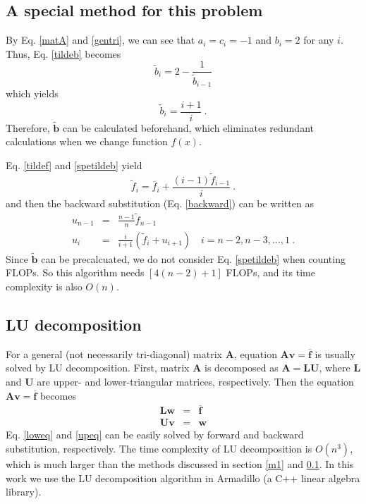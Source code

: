 \documentclass{article}
\begin{document}
	\subsection{A special method for this problem}\label{m2}
	By Eq. \ref{matA} and \ref{gentri}, we can see that $a_i=c_i=-1$ and $b_i=2$ for any $i$.  
	Thus, Eq. \ref{tildeb} becomes 
	\begin{equation}
	\tilde{b}_i=2-\frac{1}{\tilde{b}_{i-1}}
	\end{equation}
	which yields  
	\begin{equation}\label{spetildeb}
	\tilde{b}_i=\frac{i+1}{i}\ . 
	\end{equation}
	Therefore, $\tilde{\mathbf{b}}$ can be calculated beforehand, 
	which eliminates redundant calculations when we change function $f(x)$.
	\par 
	Eq. \ref{tildef} and \ref{spetildeb} yield 
	\begin{equation}
	\tilde{f}_i=\overline{f}_i+\frac{(i-1)\tilde{f}_{i-1}}{i}\ .
	\end{equation}
	and then the backward substitution (Eq. \ref{backward}) can be written as
	\begin{eqnarray}
	\nonumber
	u_{n-1}&=&\frac{n-1}{n}\tilde{f}_{n-1} \\
	u_{i}&=&\frac{i}{i+1}\left(\tilde{f}_{i}+u_{i+1}\right)\quad i=n-2,n-3,\dots,1\ .
	\end{eqnarray}
	Since $\tilde{\mathbf{b}}$ can be precalcuated, 
	we do not consider Eq. \ref{spetildeb} when counting FLOPs. 
	So this algorithm needs $[4(n-2)+1]$ FLOPs, 
	and its time complexity is also $O(n)$. 
	
	
	\subsection{LU decomposition}\label{m3}
	For a general (not necessarily tri-diagonal) matrix $\mathbf{A}$, 
	equation $\mathbf{A}\mathbf{v} = \overline{\mathbf{f}}$	is usually solved by LU decomposition. 
	First, matrix $\mathbf{A}$ is decomposed as $\mathbf{A}=\mathbf{L}\mathbf{U}$, 
	where $\mathbf{L}$ and $\mathbf{U}$ are upper- and lower-triangular matrices, respectively. 
	Then the equation $\mathbf{A}\mathbf{v} = \overline{\mathbf{f}}$ becomes 
	\begin{eqnarray}
	\mathbf{L}\mathbf{w} &=& \overline{\mathbf{f}} \label{loweq}
	\\
	\mathbf{U}\mathbf{v} &=& \mathbf{w} \label{upeq}
	\end{eqnarray}
	Eq. \ref{loweq} and \ref{upeq} can be easily solved by forward and backward substitution, respectively. 
	The time complexity of LU decomposition is $O(n^3)$, 
	which is much larger than the methods discussed in section \ref{m1} and \ref{m2}.
	In this work we use the LU decomposition algorithm in Armadillo (a C++ linear algebra library). 
	
\end{document}

